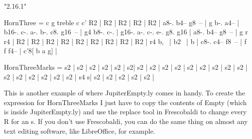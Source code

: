 \documentclass[../../LilyPond-Tutorials]{subfiles}
\begin{document}

\begin{lilypondcode}
\version "2.16.1"


HornThree = {
       \transpose c g {
              \clef treble
              \key c \major
              \relative c' {
                     \PersonalSettings
                     R2 | %
                     R2 | %
                     R2 | %
                     R2 | %
                     R2 | %
                     a8-. b4-- g8~-- | %
                     g b-. a4-- | %
                     b16-. c-. a-. b-. c8. g16~-- | %
                     g4 b8-. c-. | %
                     g16-. a-. c-. e-. g8. g16 | %
                     a8-. b4-- g8~-- | %
                     g r r4 | %
                     R2 | %
                     R2 | %
                     R2 | %
                     R2 | %
                     R2 | %
                     R2 | %
                     R2 | %
                     R2 | %
                     R2 | %
                     r4 b,~ | %
                     b2~ | %
                     b | %
                     c8-. c4-- \partcombineApart f8~-- | %
                     f f f4-- | %
                     c'8[ b a g] | %
              }
       }
}

HornThreeMarks = {
       s2 | %
       s2 | %
       s2 | %
       s2 | %
       s2 | %
       s2\forteMoltoPesante | %
       s2 | %
       s2 | %
       s2 | %
       s2 | %
       s2 | %
       s2 | %
       s2 | %
       s2 | %
       s2 | %
       s2 | %
       s2 | %
       s2 | %
       s2 | %
       s2 | %
       s2 | %
       s4 s\fff | %
       s2 | %
       s2 | %
       s2 | %
       s2 | %
       s2 | %
}\end{lilypondcode}

This is another example of where JupiterEmpty.ly comes in handy. 
To create the expression for HornThreeMarks I just have to copy the contents of Empty (which is inside JupiterEmpty.ly) and use the replace tool in Frescobaldi to change every R for an s.
If you don't use Frescobaldi, you can do the same thing on almost any text editing software, like LibreOffice, for example.
\end{document}

